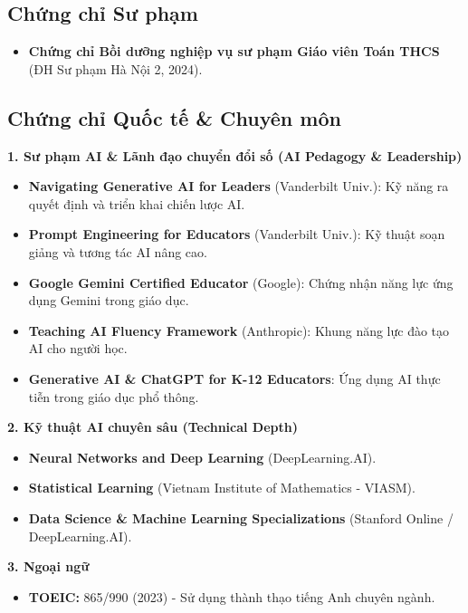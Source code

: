 \documentclass[11pt,a4paper]{article}
\begin{document}
\subsection*{Chứng chỉ Sư phạm}
\begin{itemize}
    \item \textbf{Chứng chỉ Bồi dưỡng nghiệp vụ sư phạm Giáo viên Toán THCS} (ĐH Sư phạm Hà Nội 2, 2024).
\end{itemize}

\subsection*{Chứng chỉ Quốc tế \& Chuyên môn}

\textbf{1. Sư phạm AI \& Lãnh đạo chuyển đổi số (AI Pedagogy \& Leadership)}
\begin{itemize}
    \item \textbf{Navigating Generative AI for Leaders} (Vanderbilt Univ.): Kỹ năng ra quyết định và triển khai chiến lược AI.
    \item \textbf{Prompt Engineering for Educators} (Vanderbilt Univ.): Kỹ thuật soạn giảng và tương tác AI nâng cao.
    \item \textbf{Google Gemini Certified Educator} (Google): Chứng nhận năng lực ứng dụng Gemini trong giáo dục.
    \item \textbf{Teaching AI Fluency Framework} (Anthropic): Khung năng lực đào tạo AI cho người học.
    \item \textbf{Generative AI \& ChatGPT for K-12 Educators}: Ứng dụng AI thực tiễn trong giáo dục phổ thông.
\end{itemize}

\textbf{2. Kỹ thuật AI chuyên sâu (Technical Depth)}
\begin{itemize}
    \item \textbf{Neural Networks and Deep Learning} (DeepLearning.AI).
    \item \textbf{Statistical Learning} (Vietnam Institute of Mathematics - VIASM).
    \item \textbf{Data Science \& Machine Learning Specializations} (Stanford Online / DeepLearning.AI).
\end{itemize}

\textbf{3. Ngoại ngữ}
\begin{itemize}
    \item \textbf{TOEIC:} 865/990 (2023) - Sử dụng thành thạo tiếng Anh chuyên ngành.
\end{itemize}
\end{document}
